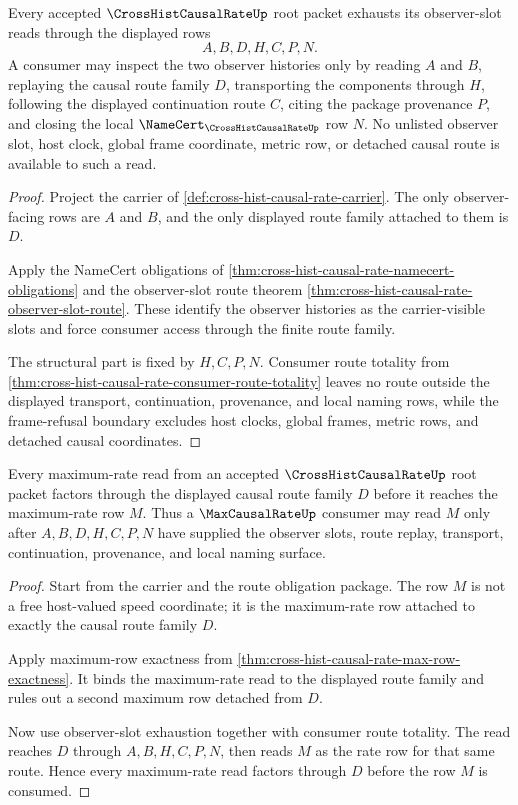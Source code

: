 \begin{theorem}
\label{thm:cross-hist-causal-rate-root-observer-slot-exhaustion}
Every accepted $\CrossHistCausalRateUp$ root packet exhausts its observer-slot reads through the displayed rows
$$
A,B,D,H,C,P,N.
$$
A consumer may inspect the two observer histories only by reading $A$ and $B$, replaying the causal route family $D$, transporting the components through $H$, following the displayed continuation route $C$, citing the package provenance $P$, and closing the local $\NameCert_{\CrossHistCausalRateUp}$ row $N$. No unlisted observer slot, host clock, global frame coordinate, metric row, or detached causal route is available to such a read.
\end{theorem}
\begin{proof}
Project the carrier of \autoref{def:cross-hist-causal-rate-carrier}. The only observer-facing rows are $A$ and $B$, and the only displayed route family attached to them is $D$.

Apply the NameCert obligations of \autoref{thm:cross-hist-causal-rate-namecert-obligations} and the observer-slot route theorem \autoref{thm:cross-hist-causal-rate-observer-slot-route}. These identify the observer histories as the carrier-visible slots and force consumer access through the finite route family.

The structural part is fixed by $H,C,P,N$. Consumer route totality from \autoref{thm:cross-hist-causal-rate-consumer-route-totality} leaves no route outside the displayed transport, continuation, provenance, and local naming rows, while the frame-refusal boundary excludes host clocks, global frames, metric rows, and detached causal coordinates.
\end{proof}

\begin{theorem}
\label{thm:cross-hist-causal-rate-root-route-rate-factorization}
Every maximum-rate read from an accepted $\CrossHistCausalRateUp$ root packet factors through the displayed causal route family $D$ before it reaches the maximum-rate row $M$. Thus a $\MaxCausalRateUp$ consumer may read $M$ only after $A,B,D,H,C,P,N$ have supplied the observer slots, route replay, transport, continuation, provenance, and local naming surface.
\end{theorem}
\begin{proof}
Start from the carrier and the route obligation package. The row $M$ is not a free host-valued speed coordinate; it is the maximum-rate row attached to exactly the causal route family $D$.

Apply maximum-row exactness from \autoref{thm:cross-hist-causal-rate-max-row-exactness}. It binds the maximum-rate read to the displayed route family and rules out a second maximum row detached from $D$.

Now use observer-slot exhaustion together with consumer route totality. The read reaches $D$ through $A,B,H,C,P,N$, then reads $M$ as the rate row for that same route. Hence every maximum-rate read factors through $D$ before the row $M$ is consumed.
\end{proof}

